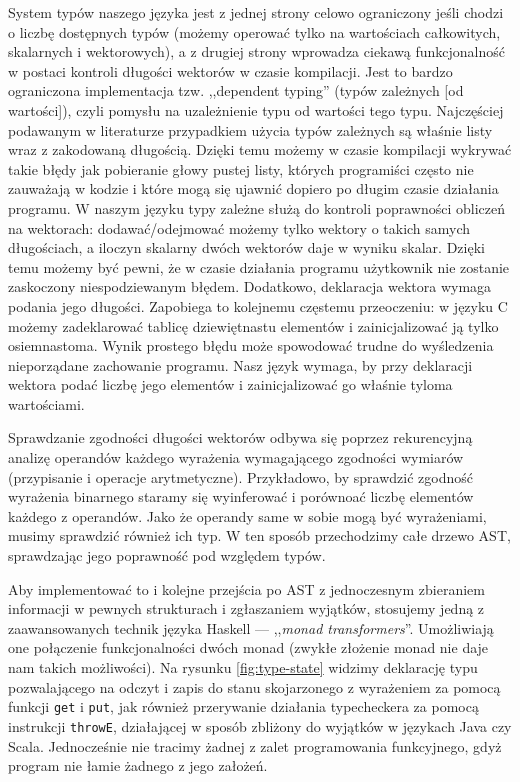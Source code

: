 System typów naszego języka jest z jednej strony celowo ograniczony jeśli chodzi o liczbę dostępnych typów (możemy operować tylko na wartościach całkowitych, skalarnych i wektorowych), a z drugiej strony wprowadza ciekawą funkcjonalność w postaci kontroli długości wektorów w czasie kompilacji. Jest to bardzo ograniczona implementacja tzw. ,,dependent typing'' (typów zależnych [od wartości]), czyli pomysłu na uzależnienie typu od wartości tego typu. Najczęściej podawanym w literaturze przypadkiem użycia typów zależnych są właśnie listy wraz z zakodowaną długością. Dzięki temu możemy w czasie kompilacji wykrywać takie błędy jak pobieranie głowy pustej listy, których programiści często nie zauważają w kodzie i które mogą się ujawnić dopiero po długim czasie działania programu. W naszym języku typy zależne służą do kontroli poprawności obliczeń na wektorach: dodawać/odejmować możemy tylko wektory o takich samych długościach, a iloczyn skalarny dwóch wektorów daje w wyniku skalar. Dzięki temu możemy być pewni, że w czasie działania programu użytkownik nie zostanie zaskoczony niespodziewanym błędem. Dodatkowo, deklaracja wektora wymaga podania jego długości. Zapobiega to kolejnemu częstemu przeoczeniu: w języku C możemy zadeklarować tablicę dziewiętnastu elementów i zainicjalizować ją tylko osiemnastoma. Wynik prostego błędu może spowodować trudne do wyśledzenia nieporządane zachowanie programu. Nasz język wymaga, by przy deklaracji wektora podać liczbę jego elementów i zainicjalizować go właśnie tyloma wartościami.

Sprawdzanie zgodności długości wektorów odbywa się poprzez rekurencyjną analizę operandów każdego wyrażenia wymagającego zgodności wymiarów (przypisanie i operacje arytmetyczne). Przykładowo, by sprawdzić zgodność wyrażenia binarnego staramy się wyinferować i porównoać liczbę elementów każdego z operandów. Jako że operandy same w sobie mogą być wyrażeniami, musimy sprawdzić również ich typ. W ten sposób przechodzimy całe drzewo AST, sprawdzając jego poprawność pod względem typów.

Aby implementować to i kolejne przejścia po AST z jednoczesnym zbieraniem informacji w pewnych strukturach i zgłaszaniem wyjątków, stosujemy jedną z zaawansowanych technik języka Haskell --- ,,\textit{monad transformers}''. Umożliwiają one połączenie funkcjonalności dwóch monad (zwykłe złożenie monad nie daje nam takich możliwości). Na rysunku \ref{fig:type-state} widzimy deklarację typu pozwalającego na odczyt i zapis do stanu skojarzonego z wyrażeniem za pomocą funkcji \texttt{get} i \texttt{put}, jak również przerywanie działania typecheckera za pomocą instrukcji \texttt{throwE}, działającej w sposób zbliżony do wyjątków w językach Java czy Scala. Jednocześnie nie tracimy żadnej z zalet programowania funkcyjnego, gdyż program nie łamie żadnego z jego założeń.

